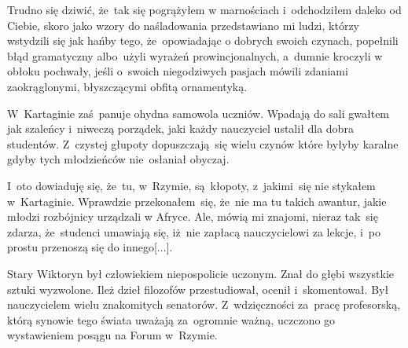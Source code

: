 \documentclass[a4paper,11pt]{article}
\begin{document}

\vspace{\spaceThree}



\noindent
Trudno się dziwić, że~tak się pogrążyłem w marnościach
i~odchodziłem daleko od Ciebie, skoro jako wzory do naśladowania
przedstawiano mi ludzi, którzy wstydzili się jak hańby tego,
że~opowiadając o dobrych swoich czynach, popełnili błąd gramatyczny
albo~użyli wyrażeń prowincjonalnych, a~dumnie kroczyli w obłoku
pochwały, jeśli o~swoich niegodziwych pasjach mówili zdaniami
zaokrąglonymi, błyszczącymi obfitą ornamentyką.


\vspace{\spaceThree}



\noindent
W~Kartaginie zaś~panuje ohydna samowola uczniów. Wpadają do sali
gwałtem jak szaleńcy i~niweczą porządek, jaki każdy nauczyciel ustalił
dla dobra studentów. Z~czystej głupoty dopuszczają~się wielu czynów
które byłyby karalne gdyby tych młodzieńców nie~osłaniał obyczaj.


\vspace{\spaceThree}



\noindent
I~oto dowiaduję się, że~tu, w~Rzymie, są~kłopoty, z~jakimi~się
nie stykałem w~Kartaginie. Wprawdzie przekonałem~się, że~nie ma tu
takich awantur, jakie młodzi rozbójnicy urządzali w Afryce. Ale, mówią
mi znajomi, nieraz tak~się zdarza, że~studenci umawiają się, iż~nie
zapłacą nauczycielowi za lekcje, i~po prostu przenoszą się do
innego[...].


\vspace{\spaceThree}



\noindent
Stary Wiktoryn był człowiekiem niepospolicie uczonym. Znał do
głębi wszystkie sztuki wyzwolone. Ileż dzieł filozofów przestudiował,
ocenił i~skomentował. Był nauczycielem wielu znakomitych
senatorów. Z~wdzięczności za~pracę profesorską, którą synowie tego
świata uważają za~ogromnie ważną, uczczono go wystawieniem posągu na
Forum w~Rzymie.
\end{document}
